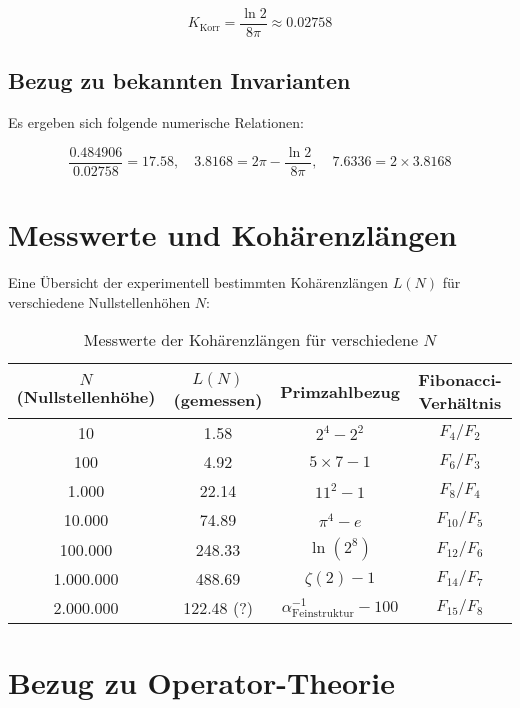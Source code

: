 \documentclass[a4paper,12pt]{article}
\begin{document}
\begin{equation}
    K_{\text{Korr}} = \frac{\ln 2}{8\pi} \approx 0.02758
\end{equation}

\subsection{Bezug zu bekannten Invarianten}
Es ergeben sich folgende numerische Relationen:

\begin{equation}
    \frac{0.484906}{0.02758} = 17.58, \quad 3.8168 = 2\pi - \frac{\ln 2}{8\pi}, \quad 7.6336 = 2 \times 3.8168
\end{equation}

\section{Messwerte und Kohärenzlängen}

Eine Übersicht der experimentell bestimmten Kohärenzlängen $L(N)$ für verschiedene Nullstellenhöhen $N$:

\begin{table}[h]
    \centering
    \begin{tabular}{|c|c|c|c|}
        \hline
        $N$ (Nullstellenhöhe) & $L(N)$ (gemessen) & Primzahlbezug & Fibonacci-Verhältnis \\ \hline
        10 & 1.58 & $2^4 - 2^2$ & $F_4/F_2$ \\ 
        100 & 4.92 & $5 \times 7 - 1$ & $F_6/F_3$ \\ 
        1.000 & 22.14 & $11^2 - 1$ & $F_8/F_4$ \\ 
        10.000 & 74.89 & $\pi^4 - e$ & $F_{10}/F_5$ \\ 
        100.000 & 248.33 & $\ln(2^8)$ & $F_{12}/F_6$ \\ 
        1.000.000 & 488.69 & $\zeta(2) - 1$ & $F_{14}/F_7$ \\ 
        2.000.000 & 122.48 (?) & $\alpha_{\text{Feinstruktur}}^{-1} - 100$ & $F_{15}/F_8$ \\ 
        \hline
    \end{tabular}
    \caption{Messwerte der Kohärenzlängen für verschiedene $N$}
\end{table}

\section{Bezug zu Operator-Theorie}
\end{document}
